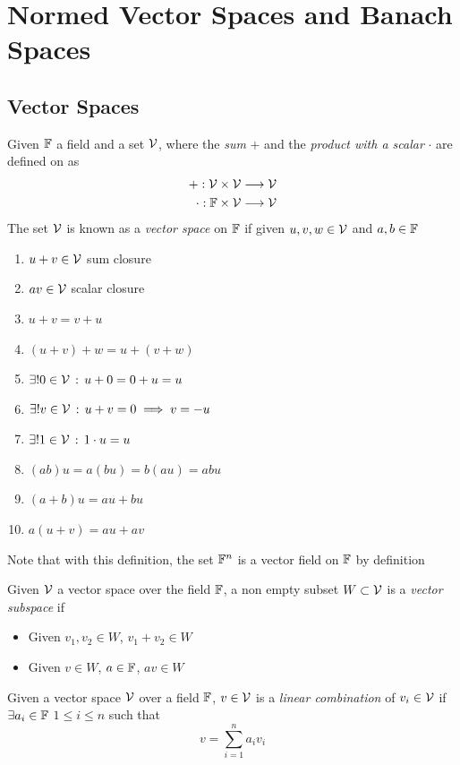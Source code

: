 \documentclass[../complete.tex]{subfiles}
\begin{document}
\section{Normed Vector Spaces and Banach Spaces}
\subsection{Vector Spaces}
\begin{dfn}
	Given $\mathbb{F}$ a field and a set $\mathcal{V}$, where the \textit{sum} $+$ and the \textit{product with a scalar} $\cdot$ are defined on as
	\begin{equation*}
		\begin{aligned}
			+:\mathcal{V}\times\mathcal{V}&\overset{}{\longrightarrow}\mathcal{V}\\
			\cdot:\mathbb{F}\times\mathcal{V}&\overset{}{\longrightarrow}\mathcal{V}
		\end{aligned}
	\end{equation*}
	The set $\mathcal{V}$ is known as a \textit{vector space} on $\mathbb{F}$ if given $u, v, w\in\mathcal{V}$ and $a, b\in\mathbb{F}$
	\begin{enumerate}
	\item $u+v\in\mathcal{V}$ sum closure
	\item $av\in\mathcal{V}$ scalar closure
	\item $u+v=v+u$
	\item $(u+v)+w=u+(v+w)$
	\item $\exists!0\in\mathcal{V}\, :\,  u+0=0+u=u$
	\item $\exists!v\in\mathcal{V}\, :\,  u+v=0\implies{} v=-u$
	\item $\exists!1\in\mathcal{V}\, :\,  1\cdot u=u$
	\item $(ab)u=a(bu)=b(au)=abu$
	\item $(a+b)u=au+bu$
	\item $a(u+v)=au+av$
	\end{enumerate}
	Note that with this definition, the set $\mathbb{F}^n$ is a vector field on $\mathbb{F}$ by definition
\end{dfn}
\begin{dfn}
	Given $\mathcal{V}$ a vector space over the field $\mathbb{F}$, a non empty subset $W\subset\mathcal{V}$ is a \textit{vector subspace} if
	\begin{itemize}
	\item Given $v_1, v_2\in W$, $v_1+v_2\in W$
	\item Given $v\in W$, $a\in\mathbb{F}$, $a v\in W$
	\end{itemize}
\end{dfn}
\begin{dfn}
	Given a vector space $\mathcal{V}$ over a field $\mathbb{F}$, $v\in\mathcal{V}$ is a \textit{linear combination} of $v_i\in \mathcal{V}$ if $\exists a_i\in\mathbb{F}$ $1\le i\le n$ such that
	\begin{equation*}
		v=\sum_{i=1}^na_iv_i
	\end{equation*}
\end{dfn}
\end{document}
